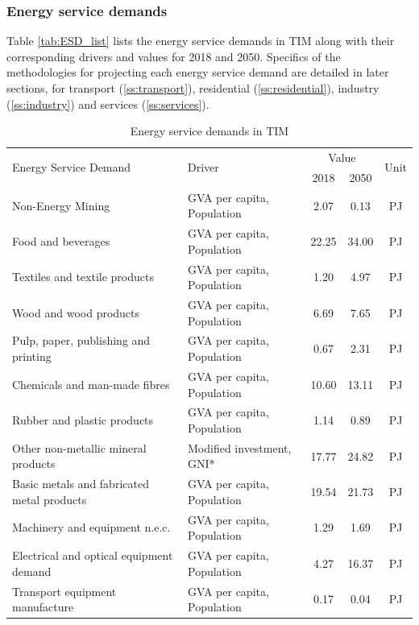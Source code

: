 \documentclass[gmd,manuscript]{copernicus}
\begin{document}
\subsubsection{Energy service demands}
Table \ref{tab:ESD_list} lists the energy service demands in TIM along with their corresponding drivers and values for 2018 and 2050. Specifics of the methodologies for projecting each energy service demand are detailed in later sections, for transport (\ref{ss:transport}), residential (\ref{ss:residential}), industry (\ref{ss:industry}) and services (\ref{ss:services}). 

\begin{table}[htbp]
\footnotesize
 \centering
 \caption{Energy service demands in TIM}
 \begin{tabular}{llccc}
 \hline
    \multirow{2}[0]{*}{Energy Service Demand} & \multirow{2}[0]{*}{Driver} & \multicolumn{2}{c}{Value} & \multirow{2}[0]{*}{Unit} \\
          &       & \multicolumn{1}{c}{2018} & \multicolumn{1}{c}{2050} &  \\ \hline
    Non-Energy Mining  & GVA per capita, Population & 2.07  & 0.13  & PJ \\
    Food and beverages  & GVA per capita, Population & 22.25 & 34.00 & PJ \\
    Textiles and textile products  & GVA per capita, Population & 1.20  & 4.97  & PJ \\
    Wood and wood products  & GVA per capita, Population & 6.69  & 7.65  & PJ \\
    Pulp, paper, publishing and printing  & GVA per capita, Population & 0.67  & 2.31  & PJ \\
    Chemicals and man-made fibres  & GVA per capita, Population & 10.60 & 13.11 & PJ \\
    Rubber and plastic products  & GVA per capita, Population & 1.14  & 0.89  & PJ \\
    Other non-metallic mineral products  & Modified investment, GNI* & 17.77 & 24.82 & PJ \\
    Basic metals and fabricated metal products  & GVA per capita, Population & 19.54 & 21.73 & PJ \\
    Machinery and equipment n.e.c.  & GVA per capita, Population & 1.29  & 1.69  & PJ \\
    Electrical and optical equipment demand & GVA per capita, Population & 4.27  & 16.37 & PJ \\
    Transport equipment manufacture  & GVA per capita, Population & 0.17  & 0.04  & PJ \\

\end{tabular}
\end{table}
\end{document}
